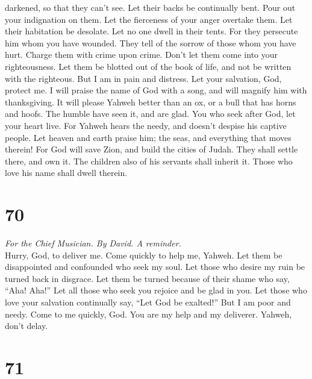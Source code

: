 darkened, so that they can't see. Let their backs be continually bent.
 Pour out your indignation on them. Let the fierceness of
your anger overtake them.  Let their habitation be
desolate. Let no one dwell in their tents.  For they
persecute him whom you have wounded. They tell of the sorrow of those
whom you have hurt.  Charge them with crime upon crime.
Don't let them come into your righteousness.  Let them be
blotted out of the book of life, and not be written with the righteous.
 But I am in pain and distress. Let your salvation, God,
protect me.  I will praise the name of God with a song,
and will magnify him with thanksgiving.  It will please
Yahweh better than an ox, or a bull that has horns and hoofs.
 The humble have seen it, and are glad. You who seek
after God, let your heart live.  For Yahweh hears the
needy, and doesn't despise his captive people.  Let
heaven and earth praise him; the seas, and everything that moves
therein!  For God will save Zion, and build the cities of
Judah. They shall settle there, and own it.  The children
also of his servants shall inherit it. Those who love his name shall
dwell therein.

\hypertarget{section-69}{%
\section{70}\label{section-69}}

\emph{For the Chief Musician. By David. A reminder.}\\
 Hurry, God, to deliver me. Come quickly to help me,
Yahweh.  Let them be disappointed and confounded who seek
my soul. Let those who desire my ruin be turned back in disgrace.
 Let them be turned because of their shame who say, ``Aha!
Aha!''  Let all those who seek you rejoice and be glad in
you. Let those who love your salvation continually say, ``Let God be
exalted!''  But I am poor and needy. Come to me quickly,
God. You are my help and my deliverer. Yahweh, don't delay.

\hypertarget{section-70}{%
\section{71}\label{section-70}}

